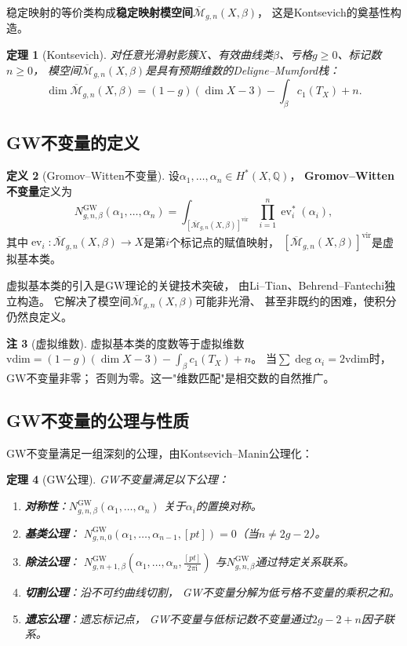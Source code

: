 \documentclass[11pt,a4paper]{article}
\theoremstyle{plain}
\newtheorem{theorem}{定理}[section]
\theoremstyle{definition}
\newtheorem{definition}[theorem]{定义}
\newtheorem{remark}[theorem]{注}
\newcommand{\Q}{\mathbb{Q}}
\newcommand{\Qbar}{\overline{\mathcal{M}}}
\newcommand{\ii}{\mathrm{i}}
\newcommand{\ev}{\operatorname{ev}}
\newcommand{\GWinv}{N^{\mathrm{GW}}}
\begin{document}
稳定映射的等价类构成\textbf{稳定映射模空间}$\Qbar_{g,n}(X, \beta)$，
这是Kontsevich的奠基性构造\cite{Kontsevich1995}。

\begin{theorem}[Kontsevich]\label{thm:konst}
对任意光滑射影簇$X$、有效曲线类$\beta$、亏格$g \geq 0$、标记数$n \geq 0$，
模空间$\Qbar_{g,n}(X, \beta)$是具有预期维数的Deligne--Mumford栈：
\[
\dim \Qbar_{g,n}(X, \beta) = (1-g)(\dim X - 3) - \int_\beta c_1(T_X) + n.
\]
\end{theorem}

\subsection{GW不变量的定义}

\begin{definition}[Gromov--Witten不变量]\label{def:gw}
设$\alpha_1, \ldots, \alpha_n \in H^*(X, \Q)$，
\textbf{Gromov--Witten不变量}定义为
\[
\GWinv_{g,n,\beta}(\alpha_1, \ldots, \alpha_n)
= \int_{[\Qbar_{g,n}(X,\beta)]^{\mathrm{vir}}} \prod_{i=1}^n \ev_i^*(\alpha_i),
\]
其中$\ev_i: \Qbar_{g,n}(X,\beta) \to X$是第$i$个标记点的赋值映射，
$[\Qbar_{g,n}(X,\beta)]^{\mathrm{vir}}$是虚拟基本类。
\end{definition}

虚拟基本类的引入是GW理论的关键技术突破，
由Li--Tian、Behrend--Fantechi独立构造\cite{BF1997}。
它解决了模空间$\Qbar_{g,n}(X,\beta)$可能非光滑、
甚至非既约的困难，使积分仍然良定义。

\begin{remark}[虚拟维数]\label{rmk:virtdim}
虚拟基本类的度数等于虚拟维数
$\mathrm{vdim} = (1-g)(\dim X - 3) - \int_\beta c_1(T_X) + n$。
当$\sum \deg \alpha_i = 2\mathrm{vdim}$时，GW不变量非零；
否则为零。这一"维数匹配"是相交数的自然推广。
\end{remark}

\subsection{GW不变量的公理与性质}

GW不变量满足一组深刻的公理，由Kontsevich--Manin公理化\cite{KM1994}：

\begin{theorem}[GW公理]\label{thm:gwaxiom}
GW不变量满足以下公理：
\begin{enumerate}[label=(\textbf{A\arabic*})]
\item \textbf{对称性}：$\GWinv_{g,n,\beta}(\alpha_1, \ldots, \alpha_n)$
关于$\alpha_i$的置换对称。
\item \textbf{基类公理}：
$\GWinv_{g,n,0}(\alpha_1, \ldots, \alpha_{n-1}, [pt]) = 0$（当$n \neq 2g-2$）。
\item \textbf{除法公理}：
$\GWinv_{g,n+1,\beta}(\alpha_1, \ldots, \alpha_n, \frac{[pt]}{2\pi\ii})$
与$\GWinv_{g,n,\beta}$通过特定关系联系。
\item \textbf{切割公理}：沿不可约曲线切割，
GW不变量分解为低亏格不变量的乘积之和。
\item \textbf{遗忘公理}：遗忘标记点，
GW不变量与低标记数不变量通过$2g-2+n$因子联系。
\end{enumerate}
\end{theorem}
\end{document}
